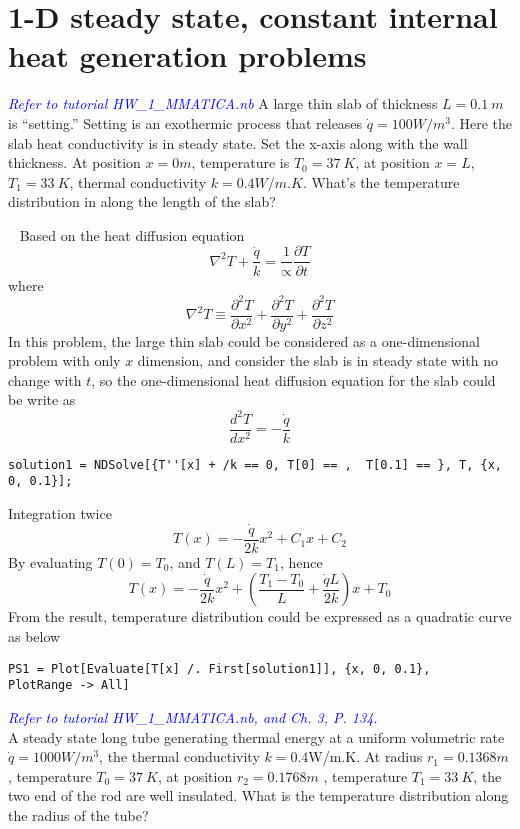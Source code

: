 \section{1-D steady state, constant	internal heat generation problems}
\begin{example}
\label{example:23}
\textcolor{blue} {\emph{Refer to tutorial HW\_1\_MMATICA.nb}}
A large thin slab of thickness $L=0.1~m$ is “setting.” Setting is an exothermic process 
that releases $\dot{q}=100W/m^3$. Here the slab heat conductivity is in steady state. 
Set the x-axis along with the wall thickness. At position $x=0m$, temperature is $T_0=37~K$,
at position $x=L$,$T_1=33~K$, thermal conductivity $k=0.4W/m.K$. What’s the
temperature distribution in along the length of the slab? 
\end{example}

\begin{solution}
~
Based on the heat diffusion equation 
$$\nabla^2 T+\frac{\dot{q}}{k}=\frac{1}{\propto}\frac{\partial T}{\partial t}$$
where
$$\nabla^2 T \equiv \frac{\partial^2 T}{\partial x^2}+
\frac{\partial^2 T}{\partial y^2}+
\frac{\partial^2 T}{\partial z^2}$$
In this problem, the large thin slab could be considered as a one-dimensional problem 
with only $x$ dimension, and consider the slab is in steady state with no change with $t$,
so the one-dimensional heat diffusion equation for the slab could be write as
$$\frac{d^2 T}{d x^2}=-\frac{\dot{q}}{k}$$
\begin{lstlisting}
solution1 = NDSolve[{T''[x] + /k == 0, T[0] == ,  T[0.1] == }, T, {x, 0, 0.1}];
\end{lstlisting}
Integration twice
$$T(x)=-\frac{\dot{q}}{2k}x^2+C_1x+C_2$$
By evaluating $T(0)=T_0$, and $T(L)=T_1$, hence
$$T(x)=-\frac{\dot{q}}{2k}x^2+ \left(\frac{T_1-T_0}{L}+\frac{\dot{q}L}{2k}\right)x+T_0$$
From the result, temperature distribution could be expressed as a quadratic curve as below
\begin{lstlisting}
PS1 = Plot[Evaluate[T[x] /. First[solution1]], {x, 0, 0.1},    PlotRange -> All]
\end{lstlisting}
\end{solution}

\begin{example}
\label{example:24}
\textcolor{blue} {\emph{Refer to tutorial HW\_1\_MMATICA.nb, and Ch. 3, P. 134.}}
~\\
A steady state long tube generating thermal energy at a uniform volumetric rate
$\dot{q}=1000W/m^3$, the thermal conductivity $k=0.4$W/m.K.
At radius $r_1=0.1368m$, temperature $T_0=37~K$, at position $r_2=0.1768m$
, temperature $T_1=33~K$, the two end of the rod are well insulated.
What is the temperature distribution along the radius of the tube?
\end{example}

